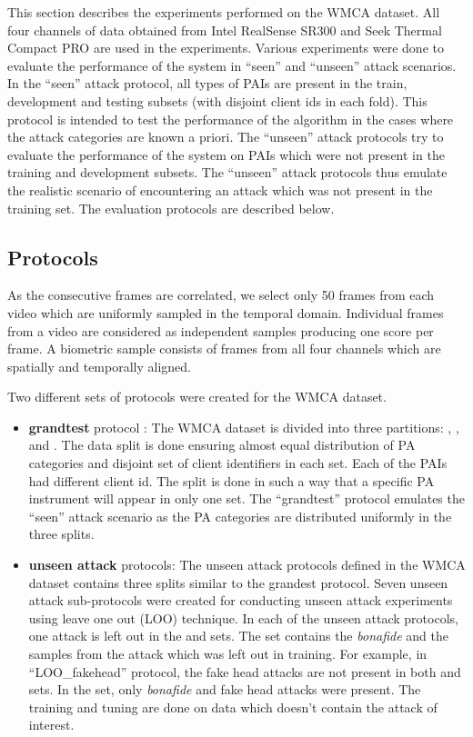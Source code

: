 \documentclass[journal]{IEEEtran}
\begin{document}
This section describes the experiments performed on the WMCA dataset.  All four channels of data obtained from Intel RealSense SR300 and Seek Thermal Compact PRO are used in the experiments. Various experiments were done to evaluate the performance of the system in ``seen'' and ``unseen''  attack scenarios. In the ``seen'' attack protocol, all types of PAIs are present in the train, development and testing subsets (with disjoint client ids in each fold). This protocol is intended to test the performance of the algorithm in the cases where the attack categories are known a priori. The ``unseen'' attack protocols try to evaluate the performance of the system on PAIs which were not present in the training and development subsets. The ``unseen'' attack protocols thus emulate the realistic scenario of encountering an attack which was not present in the training set. The evaluation protocols are described below.

\subsection{Protocols}

 As the consecutive frames are correlated, we select only 50 frames from each video which are uniformly sampled in the temporal domain. Individual frames from a video are considered as independent samples producing one score per frame. A biometric sample consists of frames from all four channels which are spatially and temporally aligned.

Two different sets of protocols were created for the WMCA dataset.


\begin{itemize}

  \item \textbf{grandtest} protocol : The WMCA dataset is divided into three partitions: , , and . The data split is done ensuring almost equal distribution of PA categories and disjoint set of client identifiers in each set. Each of the PAIs had different client id. The split is done in such a way that a specific PA instrument will appear in only one set. The ``grandtest'' protocol emulates the ``seen'' attack scenario as the PA categories are distributed uniformly in the three splits.


  \item \textbf{unseen attack} protocols: The unseen attack protocols defined in the WMCA dataset contains three splits similar to the grandest protocol. Seven unseen attack sub-protocols were created for conducting unseen attack experiments using leave one out (LOO) technique. In each of the unseen attack protocols, one attack is left out in the  and  sets. The  set contains the \textit{bonafide} and the samples from the attack which was left out in training. For example, in ``LOO\_fakehead'' protocol, the fake head attacks are not present in both  and  sets. In the  set, only \textit{bonafide} and fake head attacks were present. The training and tuning are done on data which doesn't contain the attack of interest.
\end{itemize}
\end{document}
